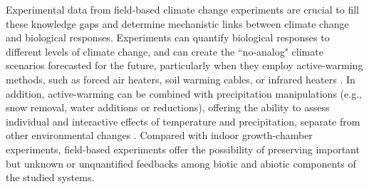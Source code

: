 \documentclass{article}
\begin{document}
\par Experimental data from field-based climate change experiments are crucial to fill these knowledge gaps and determine mechanistic links between climate change and biological responses. Experiments can quantify biological responses to different levels of climate change, and can create the ``no-analog" climate scenarios forecasted for the future, particularly when they employ active-warming methods, such as forced air heaters, soil warming cables, or infrared heaters \citep{shaver2000,williams2007b,aronson2009}. In addition, active-warming can be combined with precipitation manipulations (e.g., snow removal, water additions or reductions), offering the ability to assess individual and interactive effects of temperature and precipitation, separate from other environmental changes \citep [e.g.,][]{price1998,cleland2006,sherry2007,rollinson2012}. Compared with indoor growth-chamber experiments, field-based experiments offer the possibility of preserving important but unknown or unquantified feedbacks among biotic and abiotic components of the studied systems. %
\end{document}
